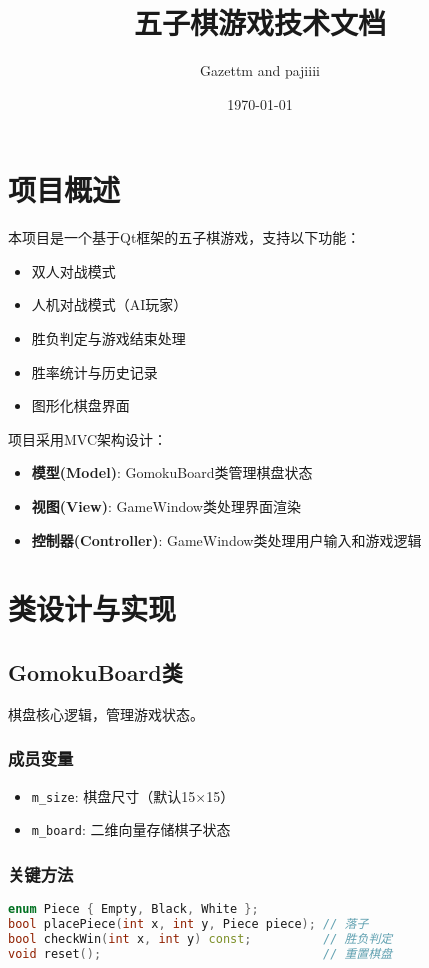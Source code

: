 \documentclass[UTF8]{ctexart}
\title{五子棋游戏技术文档}
\author{Gazettm and pajiiii}
\date{\today}
\begin{document}
\maketitle
\tableofcontents

\section{项目概述}
本项目是一个基于Qt框架的五子棋游戏，支持以下功能：
\begin{itemize}
    \item 双人对战模式
    \item 人机对战模式（AI玩家）
    \item 胜负判定与游戏结束处理
    \item 胜率统计与历史记录
    \item 图形化棋盘界面
\end{itemize}

项目采用MVC架构设计：
\begin{itemize}
    \item \textbf{模型(Model)}: GomokuBoard类管理棋盘状态
    \item \textbf{视图(View)}: GameWindow类处理界面渲染
    \item \textbf{控制器(Controller)}: GameWindow类处理用户输入和游戏逻辑
\end{itemize}

\section{类设计与实现}
\subsection{GomokuBoard类}
棋盘核心逻辑，管理游戏状态。

\subsubsection{成员变量}
\begin{itemize}
    \item \texttt{m\_size}: 棋盘尺寸（默认15×15）
    \item \texttt{m\_board}: 二维向量存储棋子状态
\end{itemize}

\subsubsection{关键方法}
\begin{lstlisting}[language=C++, caption=gomokuboard.h]
enum Piece { Empty, Black, White };
bool placePiece(int x, int y, Piece piece); // 落子
bool checkWin(int x, int y) const;          // 胜负判定
void reset();                               // 重置棋盘
\end{lstlisting}
\end{document}
